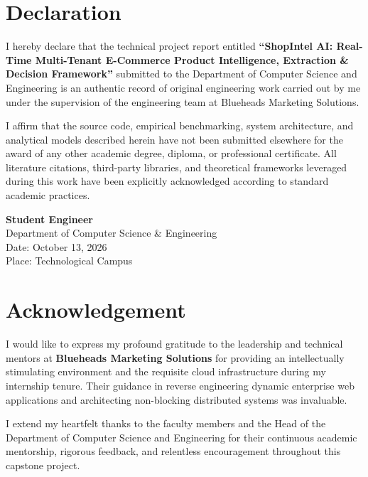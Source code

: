 \documentclass[12pt,a4paper,oneside]{report}
\begin{document}
\newpage

\chapter*{Declaration}

I hereby declare that the technical project report entitled \textbf{``ShopIntel AI: Real-Time Multi-Tenant E-Commerce Product Intelligence, Extraction \& Decision Framework''} submitted to the Department of Computer Science and Engineering is an authentic record of original engineering work carried out by me under the supervision of the engineering team at Blueheads Marketing Solutions.

I affirm that the source code, empirical benchmarking, system architecture, and analytical models described herein have not been submitted elsewhere for the award of any other academic degree, diploma, or professional certificate. All literature citations, third-party libraries, and theoretical frameworks leveraged during this work have been explicitly acknowledged according to standard academic practices.

\vspace{2.5cm}

\noindent
\textbf{Student Engineer}\\
Department of Computer Science \& Engineering\\
Date: October 13, 2026\\
Place: Technological Campus

\newpage

\chapter*{Acknowledgement}

I would like to express my profound gratitude to the leadership and technical mentors at \textbf{Blueheads Marketing Solutions} for providing an intellectually stimulating environment and the requisite cloud infrastructure during my internship tenure. Their guidance in reverse engineering dynamic enterprise web applications and architecting non-blocking distributed systems was invaluable.

I extend my heartfelt thanks to the faculty members and the Head of the Department of Computer Science and Engineering for their continuous academic mentorship, rigorous feedback, and relentless encouragement throughout this capstone project.
\end{document}

